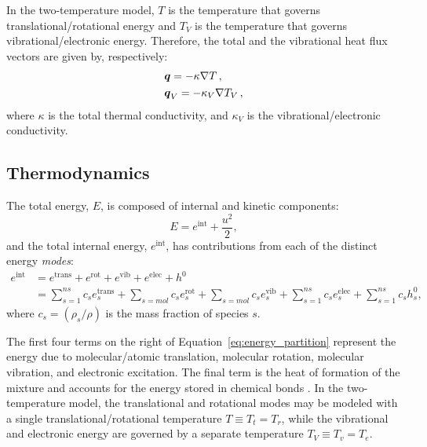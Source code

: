\documentclass[10pt]{article}
\newcommand{\bv}[1]{\ensuremath{\mbox{\boldmath$ #1 $}}}
\newcommand{\elec}{\text{elec}}
\begin{document}
In the two-temperature model, $T$ is the temperature that governs translational/rotational energy and $T_V$ is the temperature that governs vibrational/electronic energy. Therefore, the total and the vibrational heat flux vectors are given by, respectively:
\begin{align}
\label{eq:k}
 & \bv{q} = -\kappa\nabla{T}  \,,\\
\label{eq:kv}
 & \bv{q}_V = - \kappa_V\nabla{T_V} \,,
\end{align}
where $\kappa$ is the total thermal conductivity, and $\kappa_V$ is the vibrational/electronic conductivity. %


\subsection{Thermodynamics}
The total energy, $E$, is composed of internal and kinetic components: $$E = e^{\text{int}} + \dfrac{ u^2 }{2},$$ 
and the total internal energy, $e^{\text{int}}$, has contributions from each of the distinct energy \emph{modes}:%
\begin{equation}
 \begin{split}
e^{\text{int}} &= e^{\text{trans}} + e^{\text{rot}} + e^{\text{vib}} + e^{\elec} + h^0 \\
 &= \sum_{s=1}^{ns} c_s e^{\text{trans}}_s + \sum_{s=mol} c_s e^{\text{rot}}_s + \sum_{s=mol} c_s e^{\text{vib}}_s + \sum_{s=1}^{ns} c_s e^{\elec}_s + \sum_{s=1}^{ns} c_s h^0_s ,
\label{eq:energy_partition}  
 \end{split}
\end{equation}
where $c_s=\left(\rho_s/\rho\right)$ is the mass fraction of species $s$.

The first four terms on the right of Equation~\eqref{eq:energy_partition} represent the energy due to molecular/atomic translation, molecular rotation, molecular vibration, and electronic excitation. The final term is the heat of formation of the mixture and accounts for the energy stored in chemical bonds \citep{Ait1996,Kirk2011}. In the two-temperature model, the translational and rotational modes may be modeled with a single translational/rotational temperature $T\equiv T_t = T_r$, while the vibrational and electronic energy are governed by a separate temperature $T_V \equiv T_v=T_e$. 
 
\end{document}
